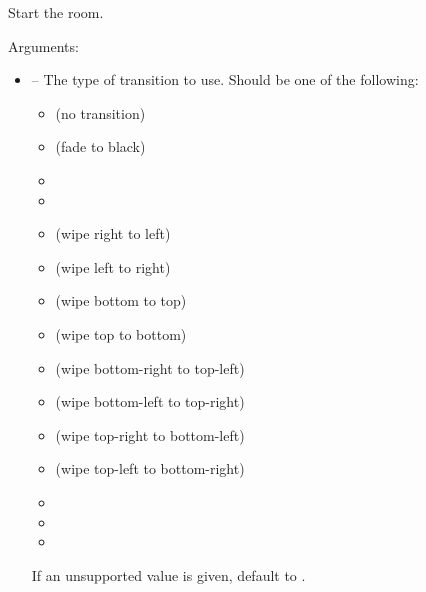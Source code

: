 \documentclass[letterpaper,10pt,english]{sphinxmanual}
\begin{document}
\begin{fulllineitems}
\label{dsp:sge.dsp.Room.start}
Start the room.

Arguments:
\begin{itemize}
\item {} 
 -- The type of transition to use.  Should be
one of the following:
\begin{itemize}
\item {} 
 (no transition)

\item {} 
 (fade to black)

\item {} 

\item {} 

\item {} 
 (wipe right to left)

\item {} 
 (wipe left to right)

\item {} 
 (wipe bottom to top)

\item {} 
 (wipe top to bottom)

\item {} 
 (wipe bottom-right to top-left)

\item {} 
 (wipe bottom-left to top-right)

\item {} 
 (wipe top-right to bottom-left)

\item {} 
 (wipe top-left to bottom-right)

\item {} 

\item {} 

\item {} 

\end{itemize}

If an unsupported value is given, default to .


\end{itemize}
\end{fulllineitems}
\end{document}
